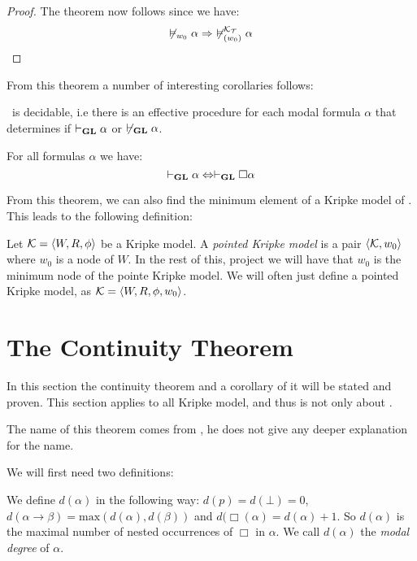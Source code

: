 \documentclass[../main.tex]{subfiles}
\begin{document}
\begin{proof}
	The theorem now follows since we have:
	\[\not\vDash_{w_0}\alpha\Rightarrow\
	\not\vDash_{(w_0)}^{\mathcal{K}_{\mathcal{T}}}\alpha\]
\end{proof}

From this theorem a number of interesting corollaries follows: 

\begin{cor}
	\GL\ is decidable, i.e there is an effective procedure for each modal formula
	$\alpha$ that determines if $\vdash_{\text{\textbf{GL}}}\alpha$ or
	$\not\vdash_{\text{\textbf{GL}}}\alpha$.
\end{cor}
\begin{cor}
	\label{cor:Nec}
	For all formulas $\alpha$ we have:
	\[\vdash_{\text{\textbf{GL}}}\alpha\Leftrightarrow\vdash_{\text{\textbf{GL}}}\Box\alpha\]
\end{cor}

From this theorem, we can also find the minimum element of a Kripke model of
\GL. This leads to the following definition:

\begin{defi}
	Let $\mathcal{K}=\langle W,R,\phi\rangle$ be a Kripke model. A \textit{pointed
	Kripke model} is a pair $\langle \mathcal{K},w_0\rangle$ where $w_0$ is a node
	of $W$. In the rest of this, project we will have that $w_0$ is the
	minimum node of the pointe Kripke model. We will often just define a pointed
	Kripke model, as $\mathcal{K}=\langle W,R,\phi,w_0\rangle$.
\end{defi}

\section{The Continuity Theorem}
In this section the continuity theorem and a corollary of it will be stated and
proven. This section applies to all Kripke model, and thus is not only about
\GL.

The name of this theorem comes from \parencite{Boolos1993}, he does not give
any deeper explanation for the name.

We will first need two definitions:
\begin{defi}
	We define $d(\alpha)$ in the following way: $d(p)=d(\bot)=0$,
	$d(\alpha\rightarrow\beta)=\text{max}(d(\alpha),d(\beta))$ and
	$d(\Box(\alpha)=d(\alpha)+1$. So $d(\alpha)$ is the maximal number of
	nested occurrences of $\Box$ in $\alpha$. We call $d(\alpha)$ the
	\textit{modal
	degree} of $\alpha$.
\end{defi}
\end{document}
